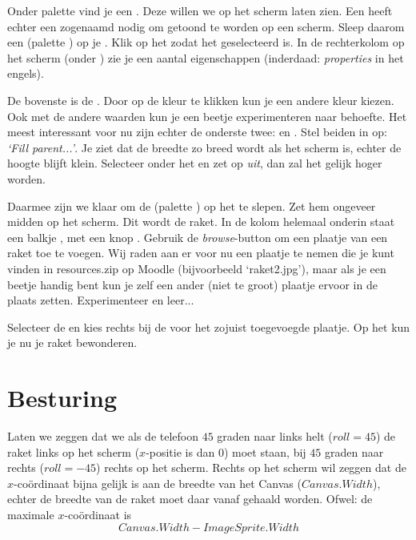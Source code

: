 Onder palette  vind je een . Deze willen we op het scherm laten zien. Een 
\linebreak {} heeft echter een zogenaamd  nodig om getoond te worden op een scherm. Sleep daarom een  (palette ) op je . Klik op het  zodat het geselecteerd is. In de rechterkolom op het scherm (onder ) zie je een aantal eigenschappen (inderdaad: \emph{properties} in het engels). 

De bovenste is de . Door op de kleur te klikken kun je een andere kleur kiezen. Ook met de andere waarden kun je een beetje experimenteren naar behoefte. Het meest interessant voor nu zijn echter de onderste twee:  en . Stel beiden in op: \emph{`Fill parent...'}. Je ziet dat de breedte zo breed wordt als het scherm is, echter de hoogte blijft klein. Selecteer onder  het  en zet  op \emph{uit}, dan zal het  gelijk hoger worden. 

Daarmee zijn we klaar om de  (palette ) op het  te slepen. Zet hem ongeveer midden op het scherm. Dit wordt de raket. In de kolom  helemaal onderin staat een balkje , met een knop . Gebruik de \emph{browse}-button om een plaatje van een raket toe te voegen. Wij raden aan er voor nu een plaatje te nemen die je kunt vinden in resources.zip op Moodle (bijvoorbeeld `raket2.jpg'), maar als je een beetje handig bent kun je zelf een ander (niet te groot) plaatje ervoor in de plaats zetten. Experimenteer en leer... 

Selecteer de  en kies rechts bij de  voor  het zojuist toegevoegde plaatje. Op het  kun je nu je raket bewonderen. 

\section{Besturing}

Laten we zeggen dat we als de telefoon $45$ graden naar links helt ($roll=45$) de raket links op het scherm ($x$-positie is dan $0$) moet staan, bij $45$ graden naar rechts ($roll= -45$) rechts op het scherm. Rechts op het scherm wil zeggen dat de $x$-co\"ordinaat bijna gelijk is aan de breedte van het Canvas ($Canvas.Width$), echter de breedte van de raket moet daar vanaf gehaald worden. Ofwel: de maximale $x$-co\"ordinaat is 
\[
     Canvas.Width - ImageSprite.Width
\]

